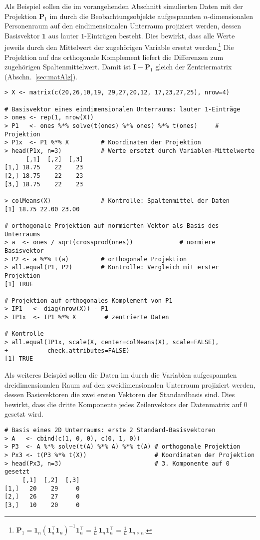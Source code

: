 Als Beispiel sollen die im vorangehenden Abschnitt simulierten Daten mit der Projektion $\bm{P}_{1}$ im durch die Beobachtungsobjekte aufgespannten $n$-dimensionalen Personenraum auf den eindimensionalen Unterraum projiziert werden, dessen Basisvektor $\bm{1}$ aus lauter $1$-Einträgen besteht. Dies bewirkt, dass alle Werte jeweils durch den Mittelwert der zugehörigen Variable ersetzt werden.\footnote{\label{ftn:ones}$\bm{P}_{1} = \bm{1}_{n} (\bm{1}_{n}^{\top} \bm{1}_{n})^{-1} \bm{1}_{n}^{\top} = \frac{1}{n} \, \bm{1}_{n} \bm{1}_{n}^{\top} = \frac{1}{n} \, \bm{1}_{n \times n}$.} Die Projektion auf das orthogonale Komplement liefert die Differenzen zum zugehörigen Spaltenmittelwert. Damit ist $\bm{I}-\bm{P}_{1}$ gleich der Zentriermatrix (Abschn.\ \ref{sec:matAlg}).
\begin{lstlisting}
> X <- matrix(c(20,26,10,19, 29,27,20,12, 17,23,27,25), nrow=4)

# Basisvektor eines eindimensionalen Unterraums: lauter 1-Einträge
> ones <- rep(1, nrow(X))
> P1   <- ones %*% solve(t(ones) %*% ones) %*% t(ones)     # Projektion
> P1x  <- P1 %*% X         # Koordinaten der Projektion
> head(P1x, n=3)           # Werte ersetzt durch Variablen-Mittelwerte
      [,1]  [,2]  [,3]
[1,] 18.75    22    23
[2,] 18.75    22    23
[3,] 18.75    22    23

> colMeans(X)              # Kontrolle: Spaltenmittel der Daten
[1] 18.75 22.00 23.00

# orthogonale Projektion auf normierten Vektor als Basis des Unterraums
> a  <- ones / sqrt(crossprod(ones))             # normiere Basisvektor
> P2 <- a %*% t(a)         # orthogonale Projektion
> all.equal(P1, P2)        # Kontrolle: Vergleich mit erster Projektion
[1] TRUE

# Projektion auf orthogonales Komplement von P1
> IP1   <- diag(nrow(X)) - P1
> IP1x  <- IP1 %*% X        # zentrierte Daten

# Kontrolle
> all.equal(IP1x, scale(X, center=colMeans(X), scale=FALSE),
+           check.attributes=FALSE)
[1] TRUE
\end{lstlisting}

Als weiteres Beispiel sollen die Daten im durch die Variablen aufgespannten dreidimensionalen Raum auf den zweidimensionalen Unterraum projiziert werden, dessen Basisvektoren die zwei ersten Vektoren der Standardbasis sind. Dies bewirkt, dass die dritte Komponente jedes Zeilenvektors der Datenmatrix auf $0$ gesetzt wird.
\begin{lstlisting}
# Basis eines 2D Unterraums: erste 2 Standard-Basisvektoren
> A   <- cbind(c(1, 0, 0), c(0, 1, 0))
> P3  <- A %*% solve(t(A) %*% A) %*% t(A) # orthogonale Projektion
> Px3 <- t(P3 %*% t(X))                   # Koordinaten der Projektion
> head(Px3, n=3)                          # 3. Komponente auf 0 gesetzt
     [,1]  [,2]  [,3]
[1,]   20    29     0
[2,]   26    27     0
[3,]   10    20     0
\end{lstlisting}

